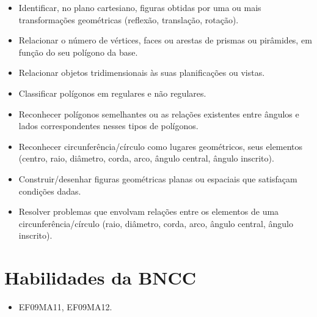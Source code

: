 \begin{escolha}
\begin{boxmedio}
\begin{boxmedio}
{\begin{boxpeq}
\begin{boxpeq}
{\begin{boxpeq}
\begin{boxmedio}
\begin{boxmedio}
\begin{boxpeq}
\begin{boxmedio}
\begin{boxpeq}
\begin{boxpeq}
\begin{boxpeq}
\begin{boxpeq}
\begin{boxmedio}
{\begin{boxmedio}
\begin{boxmedio}
\begin{boxpeq}
\begin{boxmedio}
\begin{boxpeq}
\begin{boxpeq}
\begin{boxpeq}
\begin{escolha}
{\begin{boxmedio}
\begin{boxpeq}
\begin{boxpeq}
\begin{boxpeq}
\begin{boxpeq}
\begin{boxpeq}
\begin{boxmedio}
\begin{boxpeq}
\begin{boxpeq}
\begin{boxpeq}
{\begin{boxpeq}
\begin{boxmedio}
\begin{boxpeq}
\begin{boxpeq}
\begin{boxpeq}
{\begin{boxpeq}
\begin{boxmedio}
{\begin{boxpeq}
\begin{boxpeq}
\begin{boxmedio}
\begin{boxmedio}
\begin{boxpeq}
\begin{boxpeq}
{\begin{boxpeq}
\begin{itemize}
  \item Identificar, no plano cartesiano, figuras obtidas por uma ou mais
transformações geométricas (reflexão, translação, rotação).
  \item Relacionar o número de vértices, faces ou arestas de prismas ou
pirâmides, em função do seu polígono da base.
  \item Relacionar objetos tridimensionais às suas planificações ou vistas.
  \item Classificar polígonos em regulares e não regulares.
  \item Reconhecer polígonos semelhantes ou as relações existentes entre
ângulos e lados correspondentes nesses tipos de polígonos.
  \item Reconhecer circunferência/círculo como lugares geométricos, seus
elementos (centro, raio, diâmetro, corda, arco, ângulo central, ângulo
inscrito).
  \item Construir/desenhar figuras geométricas planas ou espaciais que
satisfaçam condições dadas.
  \item Resolver problemas que envolvam relações entre os elementos de uma
circunferência/círculo (raio, diâmetro, corda, arco, ângulo central, ângulo
inscrito).

\end{itemize} 

\section{Habilidades da BNCC}

\begin{itemize}
  \item EF09MA11, EF09MA12.
\end{itemize}

\conteudo{

}
\end{boxpeq}}
\end{boxpeq}
\end{boxpeq}
\end{boxmedio}
\end{boxmedio}
\end{boxpeq}
\end{boxpeq}}
\end{boxmedio}
\end{boxpeq}}
\end{boxpeq}
\end{boxpeq}
\end{boxpeq}
\end{boxmedio}
\end{boxpeq}}
\end{boxpeq}
\end{boxpeq}
\end{boxpeq}
\end{boxmedio}
\end{boxpeq}
\end{boxpeq}
\end{boxpeq}
\end{boxpeq}
\end{boxpeq}
\end{boxmedio}}
\end{escolha}
\end{boxpeq}
\end{boxpeq}
\end{boxpeq}
\end{boxmedio}
\end{boxpeq}
\end{boxmedio}
\end{boxmedio}}
\end{boxmedio}
\end{boxpeq}
\end{boxpeq}
\end{boxpeq}
\end{boxpeq}
\end{boxmedio}
\end{boxpeq}
\end{boxmedio}
\end{boxmedio}
\end{boxpeq}}
\end{boxpeq}
\end{boxpeq}}
\end{boxmedio}
\end{boxmedio}
\end{escolha}
